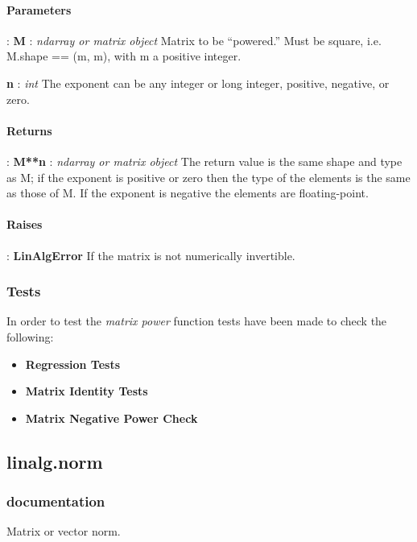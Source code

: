 \documentclass[a4paper,11pt]{article}
\begin{document}
\paragraph{Parameters}: \textbf{M} : \textit{ndarray or matrix object} Matrix to be “powered.” Must be square, i.e. M.shape == (m, m), with m a positive integer.

\textbf{n} : \textit{int} The exponent can be any integer or long integer, positive, negative, or zero.

\paragraph{Returns}: \textbf{M**n} : \textit{ndarray or matrix object} The return value is the same shape and type as M; if the exponent is positive or zero then the type of the elements is the same as those of M. If the exponent is negative the elements are floating-point.

\paragraph{Raises}:	\textbf{LinAlgError} If the matrix is not numerically invertible.

\subsubsection{Tests}
In order to test the \textit{matrix power} function tests have been made to check the following:

\begin{itemize}
	\item \textbf{Regression Tests}
	\item \textbf{Matrix Identity Tests}
	\item \textbf{Matrix Negative Power Check}
\end{itemize}



\subsection{linalg.norm}
\subsubsection{documentation}
Matrix or vector norm.
\end{document}
